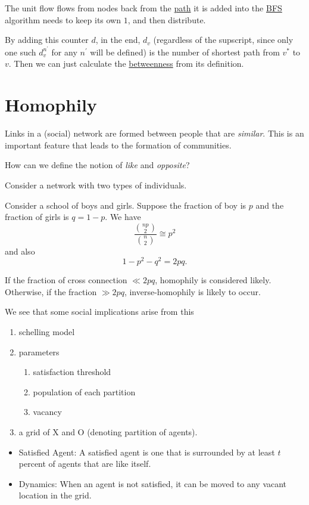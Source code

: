 The unit flow flows from nodes back from the \hyperref[def:path]{path} it is added into the \hyperref[algo:BFS]{BFS} algorithm needs to keep its own \(1\), and then distribute.

\begin{remark}
	By adding this counter \(d\), in the end, \(d_v\) (regardless of the supscript, since only one such \(d_v^{n^\prime }\) for any \(n^\prime \) will be defined) is
	the number of shortest path from \(v^{\ast} \) to \(v\). Then we can just calculate the \hyperref[def:betweenness]{betweenness} from its definition.
\end{remark}

\section{Homophily}
Links in a (social) network are formed between people that are \emph{similar}. This is an important feature that leads to
the formation of communities.

\begin{problem}
How can we define the notion of \emph{like} and \emph{opposite}?
\end{problem}
\begin{answer}
	Consider a network with two types of individuals.
\end{answer}

\begin{eg}
	Consider a school of boys and girls. Suppose the fraction of boy is $p$ and the fraction of girls is $q = 1 - p$. We have
	\[
		\frac{\binom{np}{2}}{\binom{n}{2}} \cong p^2
	\]
	and also
	\[
		1 - p^2 - q^2 = 2pq.
	\]

	If the fraction of cross connection $\ll 2pq$, homophily is considered likely. Otherwise, if the fraction $\gg 2pq$, inverse-homophily is likely to occur.
\end{eg}

We see that some social implications arise from this
\begin{enumerate}
	\item schelling model
	\item parameters
	      \begin{enumerate}
		      \item satisfaction threshold
		      \item population of each partition
		      \item vacancy
	      \end{enumerate}
	\item a grid of X and O (denoting partition of agents).
\end{enumerate}

\begin{itemize}
	\item Satisfied Agent: A satisfied agent is one that is surrounded by at least \(t\) percent of agents that are like itself.
	\item Dynamics: When an agent is not satisfied, it can be moved to any vacant location in the grid.
\end{itemize}

